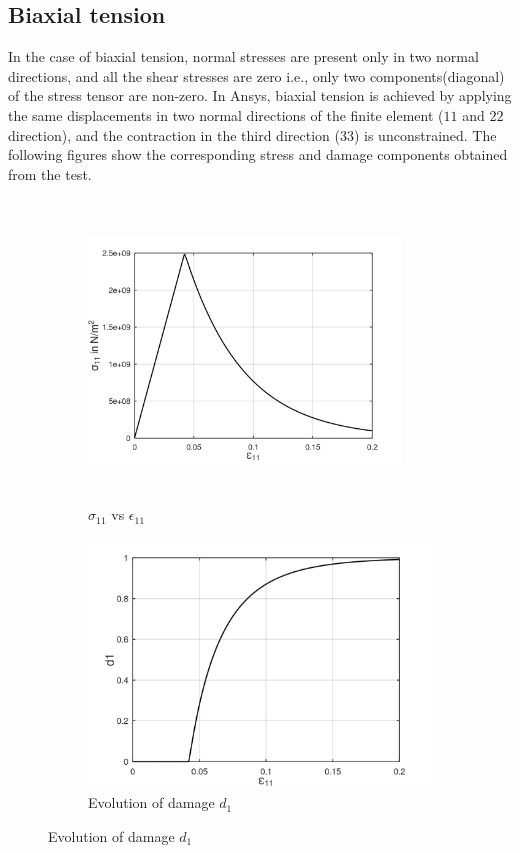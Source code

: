 \documentclass[a4paper,12pt,twoside]{report}
\begin{document}
\subsection{Biaxial tension}
\indent\indent\indent  In the case of biaxial tension, normal stresses are present only in two normal directions, and all the shear stresses are zero i.e., only two components(diagonal) of the stress tensor are non-zero. In Ansys, biaxial tension is achieved by applying the same displacements in two normal directions of the finite element ($11$ and $22$ direction), and the contraction in the third direction ($33$) is unconstrained. The following figures show the corresponding stress and damage components obtained from the test.
\begin{figure}[hbt!]
     \captionsetup[subfigure]{justification=centering}
     \begin{subfigure}{0.4\textwidth}
         \includegraphics[width=8.3cm,height=8cm,keepaspectratio]{23.S11vsE11.png}
         \caption{$\sigma_{11}$ vs $\epsilon_{11}$}
         \label{fig:S11vsE11}
     \end{subfigure}
	\hspace{1.8cm}
     \captionsetup[subfigure]{justification=centering}
     \begin{subfigure}{0.4\textwidth}
         \includegraphics[width=1.25\textwidth]{23.d1.png}
         \caption{Evolution of damage $d_{1}$}
         \label{fig:Evolution of damage d1}
     \end{subfigure}
\end{figure}
\end{document}
